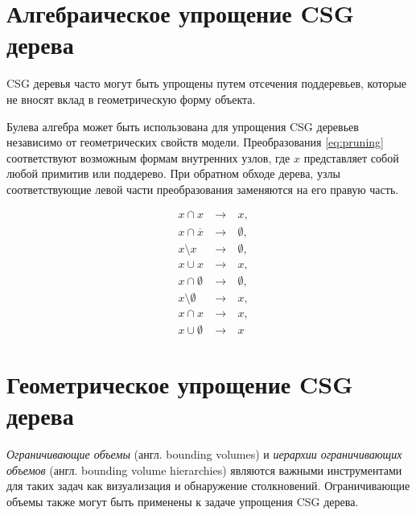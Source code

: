 \section{Алгебраическое упрощение CSG дерева} \label{sect_csg_tree_pruning}

CSG деревья часто могут быть упрощены путем отсечения поддеревьев, которые не вносят вклад в геометрическую форму объекта.

Булева алгебра может быть использована для упрощения CSG деревьев независимо от геометрических свойств модели. Преобразования \ref{eq:pruning} соответствуют возможным формам внутренних узлов, где $x$ представляет собой любой примитив или поддерево. При обратном обходе дерева, узлы соответствующие левой части преобразования заменяются на его правую часть.

\begin{equation}
  \label{eq:pruning}
  \begin{alignedat}{2}
    &x \cap x \  & \rightarrow \  &x, \\
    &x \cap \overline{x} \  & \rightarrow \  &\emptyset, \\
    &x \setminus x \  & \rightarrow \  &\emptyset, \\
    &x \cup x \  & \rightarrow \  &x, \\
    &x \cap \emptyset \  & \rightarrow \  &\emptyset, \\
    &x \setminus \emptyset \  & \rightarrow \  &x, \\
    &x \cap x \  & \rightarrow \  &x, \\
    &x \cup \emptyset \  & \rightarrow \  &x
  \end{alignedat}
\end{equation}

\section{Геометрическое упрощение CSG дерева} \label{sect_csg_bound_pruning}

\textit{Ограничивающие объемы} (англ. bounding volumes) и \textit{иерархии ограничивающих объемов} (англ. bounding volume hierarchies) являются важными инструментами для таких задач как визуализация  и обнаружение столкновений. Ограничивающие объемы также могут быть применены к задаче упрощения CSG дерева.

